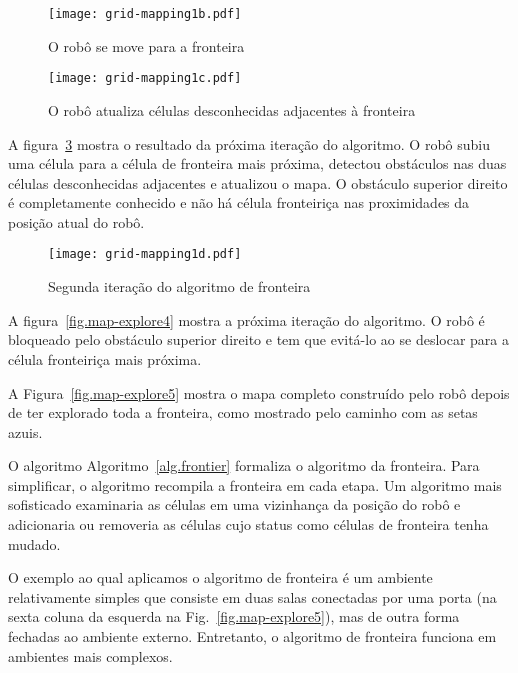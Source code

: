 \begin{figure}
\begin{center}
\texttt{[image: grid-mapping1b.pdf]}
\end{center}
\caption{O robô se move para a fronteira}\label{fig.map-explore1}
\end{figure}

\begin{figure}
\begin{center}
\texttt{[image: grid-mapping1c.pdf]}
\end{center}
\caption{O robô atualiza células desconhecidas adjacentes à fronteira}\label{fig.map-explore2}
\end{figure}

A figura~\ref{fig.map-explore3} mostra o resultado da próxima iteração do algoritmo. O robô subiu uma célula para a célula de fronteira mais próxima, detectou obstáculos nas duas células desconhecidas adjacentes e atualizou o mapa. O obstáculo superior direito é completamente conhecido e não há célula fronteiriça nas proximidades da posição atual do robô.

\begin{figure}
\begin{center}
\texttt{[image: grid-mapping1d.pdf]}
\end{center}
\caption{Segunda iteração do algoritmo de fronteira}\label{fig.map-explore3}
\end{figure}

A figura~\ref{fig.map-explore4} mostra a próxima iteração do algoritmo. O robô é bloqueado pelo obstáculo superior direito e tem que evitá-lo ao se deslocar para a célula fronteiriça mais próxima.

A Figura~\ref{fig.map-explore5} mostra o mapa completo construído pelo robô depois de ter explorado toda a fronteira, como mostrado pelo caminho com as setas azuis. 

O algoritmo Algoritmo~\ref{alg.frontier} formaliza o algoritmo da fronteira. Para simplificar, o algoritmo recompila a fronteira em cada etapa. Um algoritmo mais sofisticado examinaria as células em uma vizinhança da posição do robô e adicionaria ou removeria as células cujo status como células de fronteira tenha mudado.

O exemplo ao qual aplicamos o algoritmo de fronteira é um ambiente relativamente simples que consiste em duas salas conectadas por uma porta (na sexta coluna da esquerda na Fig.~\ref{fig.map-explore5}), mas de outra forma fechadas ao ambiente externo. Entretanto, o algoritmo de fronteira funciona em ambientes mais complexos. 

